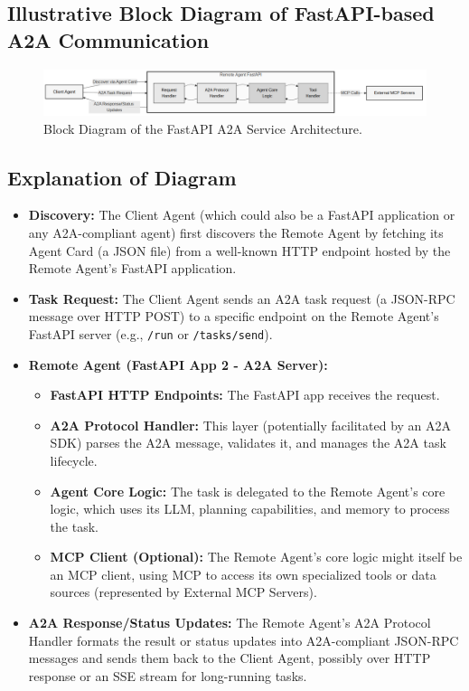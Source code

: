 \subsection*{Illustrative Block Diagram of FastAPI-based A2A Communication}
\begin{figure}[htbp]
    \centering
    \includegraphics[width=\textwidth]{diagrams/mcp-a2a_block.png}
    \caption{Block Diagram of the FastAPI A2A Service Architecture.}
    \label{fig:mcp_a2a_diagram}
\end{figure}

\subsection*{Explanation of Diagram}
\begin{itemize}
    \item \textbf{Discovery:} The Client Agent (which could also be a FastAPI application or any A2A-compliant agent) first discovers
     the Remote Agent by fetching its Agent Card (a JSON file) from a well-known HTTP endpoint hosted by the Remote Agent's FastAPI application.
    \item \textbf{Task Request:} The Client Agent sends an A2A task request (a JSON-RPC message over HTTP POST) to a specific endpoint on 
    the Remote Agent's FastAPI server (e.g., \texttt{/run} or \texttt{/tasks/send}).
    \item \textbf{Remote Agent (FastAPI App 2 - A2A Server):}
    \begin{itemize}
        \item \textbf{FastAPI HTTP Endpoints:} The FastAPI app receives the request.
        \item \textbf{A2A Protocol Handler:} This layer (potentially facilitated by an A2A SDK) parses the A2A message, validates it, and 
        manages the A2A task lifecycle.
        \item \textbf{Agent Core Logic:} The task is delegated to the Remote Agent's core logic, which uses its LLM, planning capabilities, 
        and memory to process the task.
        \item \textbf{MCP Client (Optional):} The Remote Agent's core logic might itself be an MCP client, using MCP to access its 
        own specialized tools or data sources (represented by External MCP Servers).
    \end{itemize}
    \item \textbf{A2A Response/Status Updates:} The Remote Agent's A2A Protocol Handler formats the result or status updates into 
    A2A-compliant JSON-RPC messages and sends them back to the Client Agent, possibly over HTTP response or an SSE stream for long-running tasks.
\end{itemize}

